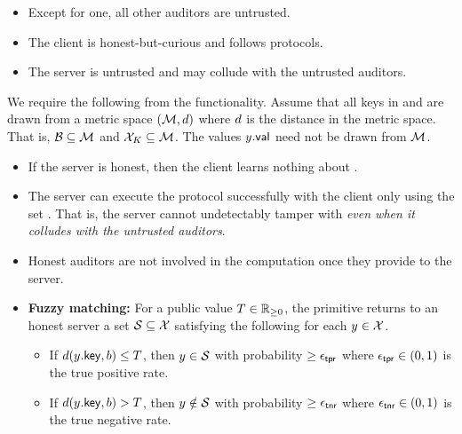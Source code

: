 \begin{itemize}
	\item Except for one, all other auditors are untrusted.
	\item The client is honest-but-curious and follows protocols.
	\item The server is untrusted and may collude with the untrusted auditors. 
\end{itemize}


%
We require the following from the \dPSI functionality. Assume that all
keys in \blocklist and \cInputSet are drawn from a metric space
$(\metricSpace, \distance)$ where $\distance$ is the distance in the
metric space. That is, $\blocklist \subseteq \metricSpace$ and
$\cInputKeySet \subseteq \metricSpace$.  The values
$\genericCInputElmt.\valueLabel$ need not be drawn from
$\metricSpace$.

\begin{itemize}
	\item If the server is honest, then the client learns nothing
          about \blocklist.
	\item The server can execute the protocol successfully with
          the client only using the set \blocklist.  That is, the
          server cannot undetectably tamper with \blocklist
          \textit{even when it colludes with the untrusted auditors}.
	\item Honest auditors are not involved in the computation once
          they provide \blocklist to the server.
	\item \textbf{Fuzzy matching:} For a public value $T
          \in \mathbb{R}_{\ge 0}$, the primitive returns to an honest
          server a set $\genericSetVar \subseteq \cInputSet$
          satisfying the following for each $\genericCInputElmt\in
          \cInputSet$.
	  \begin{itemize}
	  \item If
            $\distanceNotation[\distance][\genericCInputElmt.\keyLabel][\genericBlocklistElmt]
            \leq \threshold$, then $\genericCInputElmt \in
            \genericSetVar$ with probability $\ge \epsilon_\mathsf{tpr}$ where $\epsilon_\mathsf{tpr}
            \in (0,1)$ is the true positive rate.
	  \item If
            $\distanceNotation[\distance][\genericCInputElmt.\keyLabel][\genericBlocklistElmt]
            > \threshold$, then $\genericCInputElmt \notin
            \genericSetVar$ with probability $\ge \epsilon_\mathsf{tnr}$ where $\epsilon_\mathsf{tnr}
            \in (0,1)$ is the true negative rate.
	  \end{itemize}
\end{itemize}
\fi

